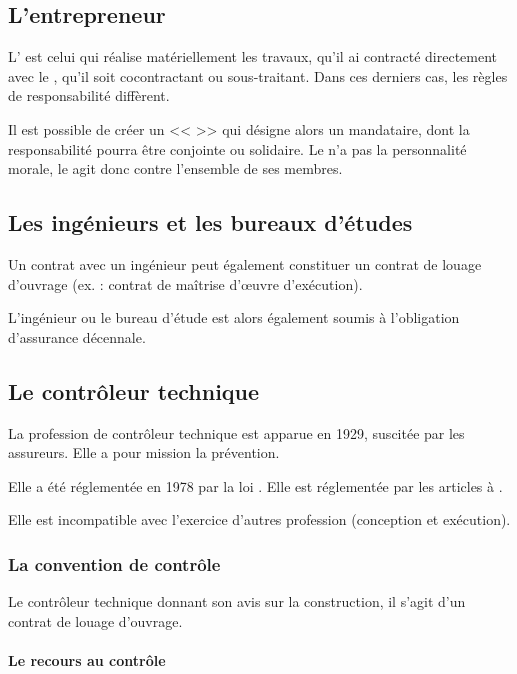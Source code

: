 		\subsection{L'entrepreneur}

			L'\E{} est celui qui réalise matériellement les travaux, qu'il ai contracté directement avec le \Mo{}, qu'il soit cocontractant ou sous-traitant. Dans ces derniers cas, les règles de responsabilité diffèrent.

			Il est possible de créer un << \GME{} >> qui désigne alors un mandataire, dont la responsabilité pourra être conjointe ou solidaire. Le \GME{} n'a pas la personnalité morale, le \Mo{} agit donc contre l'ensemble de ses membres.

		\subsection{Les ingénieurs et les bureaux d'études}

			Un contrat avec un ingénieur peut également constituer un contrat de louage d'ouvrage (ex. : contrat de maîtrise d'œuvre d'exécution).

			L'ingénieur ou le bureau d'étude est alors également soumis à l'obligation d'assurance décennale.

		\subsection{Le contrôleur technique}

			La profession de contrôleur technique est apparue en 1929, suscitée par les assureurs. Elle a pour mission la prévention.

			Elle a été réglementée en 1978 par la loi . Elle est réglementée par les articles  à .

			Elle est incompatible avec l'exercice d'autres profession (conception et exécution).

			\subsubsection{La convention de contrôle}

				Le contrôleur technique donnant son avis sur la construction, il s'agit d'un contrat de louage d'ouvrage.

				\paragraph{Le recours au contrôle}

